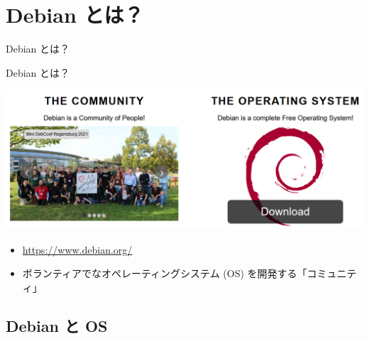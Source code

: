 
\section{Debian とは？}

\begin{frame}
  \begin{center}\Huge{Debian とは？}\end{center}
\end{frame}


\begin{frame}{Debian とは？}

\includegraphics[scale=0.4]{image202110/www-debian-org.png}

\begin{itemize}
\item \url{https://www.debian.org/}
\item ボランティアで{\color{red}{フリー/オープン}}な{\color{red}{ユニバーサル}}オペレーティングシステム (OS) を開発する「コミュニティ」
\end{itemize}

\end{frame}

\subsection{Debian と OS}

